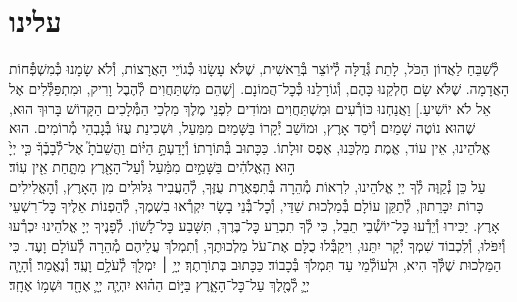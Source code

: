 \documentclass[twoside, openany, parskip=half, 11pt]{book}
\begin{document}
\uvaletzion

\\
\\


\label{end of shacharis}
\fullkaddish

\section*{ עלינו }

\newcommand{\aleinu}{
\firstword{עָלֵֽינוּ}
לְ֯שַׁבֵּחַ לַאֲדוֹן הַכֹּל, לָתֵת גְּ֯דֻלָּה לְ֯יוֹצֵר בְּ֯רֵאשִׁית, שֶׁלֹּא עָשָׂנוּ כְּ֯גוֹיֵי הָאֲרָצוֹת, וְ֯לֹא שָׂמָנוּ כְּ֯מִשְׁפְּ֯חוֹת הָאֲדָמָה. שֶׁלֹּא שָׂם חֶלְקֵנוּ כָּהֶם, וְ֯גוֹרָלֵנוּ כְּ֯כׇל־הֲמוֹנָם. [שֶׁהֵם מִשְׁתַּחֲוִים לְ֯הֶבֶל וָרִיק, וּמִתְפַּלְּ֯לִים אֶל אֵל לֹא יוֹשִׁיעַ.] וַאֲנַחְנוּ כּוֹרְ֯עִים וּמִשְׁתַּחֲוִים וּמוֹדִים לִפְנֵי מֶלֶךְ מַלְכֵי הַמְּ֯לָכִים הַקָּדוֹשׁ בָּרוּךְ הוּא, שֶׁהוּא נוֹטֶה שָׁמַיִם וְ֯יֹסֵד אָרֶץ, וּמוֹשַׁב יְ֯קָרוֹ בַּשָּׁמַיִם מִמַּעַל, וּשְׁכִינַת עֻזּוֹ בְּ֯גׇבְהֵי מְ֯רוֹמִים. הוּא אֱלֹהֵינוּ, אֵין עוֹד, אֱמֶת מַלְכֵּנוּ, אֶפֶס זוּלָתוֹ. כַּכָּתוּב בְּ֯תּוֹרָתוֹ׃ וְ֯יָדַעְתָּ֣
\source{דברים ד}
הַיּ֗וֹם וַהֲשֵׁבֹתָ֮ אֶל־לְ֯בָבֶ֒ךָ֒ כִּ֤י יְיָ֙ ה֣וּא הָֽאֱלֹהִ֔ים בַּשָּׁמַ֣יִם מִמַּ֔עַל וְ֯עַל־הָאָ֖רֶץ מִתָּ֑חַת אֵ֖ין עֽוֹד׃\\
עַל כֵּן נְ֯קַוֶּה לְ֯ךָ יְיָ אֱלֹהֵינוּ, לִרְאוֹת מְ֯הֵרָה בְּ֯תִפְאֶרֶת עֻזֶּךָ, לְ֯הַעֲבִיר גִּלּוּלִים מִן הָאָרֶץ, וְ֯הָאֱלִילִים כָּרוֹת יִכָּרֵתוּן, לְ֯תַקֵּן עוֹלָם בְּ֯מַלְכוּת שַׁדַּי, וְ֯כׇל־בְּ֯נֵי בָשָׂר יִקְרְ֯אוּ בִשְׁמֶךָ, לְ֯הַפְנוֹת אֵלֶיךָ כׇּל־רִשְׁעֵי אָרֶץ. יַכִּירוּ וְ֯יֵדְ֯עוּ כׇּל־יוֹשְׁ֯בֵי תֵבֵל, כִּי לְ֯ךָ תִכְרַע כׇּל־בֶּרֶךְ, תִּשָּׁבַע כׇּל־לָשׁוֹן. לְ֯פָנֶיךָ יְיָ אֱלֹהֵינוּ יִכְרְ֯עוּ וְ֯יִפֹּלוּ, וְ֯לִכְבוֹד שִׁמְךָ יְ֯קָר יִתֵּנוּ, וִיקַבְּ֯לוּ כֻלָּם אֶת־עֹל מַלְכוּתֶךָ, וְ֯תִמְלֹךְ עֲלֵיהֶם מְ֯הֵרָה לְ֯עוֹלָם וָעֶד. כִּי הַמַּלְכוּת שֶׁלְּ֯ךָ הִיא, וּלְעוֹלְ֯מֵי עַד תִּמְלֹךְ בְּ֯כָבוֹד׃ כַּכָּתוּב בְּתוֹרָתֶךָ׃\source{שמות טו} יְיָ֥ ׀ יִמְלֹ֖ךְ לְ֯עֹלָ֥ם וָעֶֽד׃ וְ֯נֶאֱמַר׃\source{זכריה יד} וְ֯הָיָ֧ה יְיָ֛ לְ֯מֶ֖לֶךְ עַל־כׇּל־הָאָ֑רֶץ בַּיּ֣וֹם הַה֗וּא יִהְיֶ֧ה יְיָ֛ אֶחָ֖ד וּשְׁמ֥וֹ אֶחָֽד׃
}

\aleinu
\end{document}
